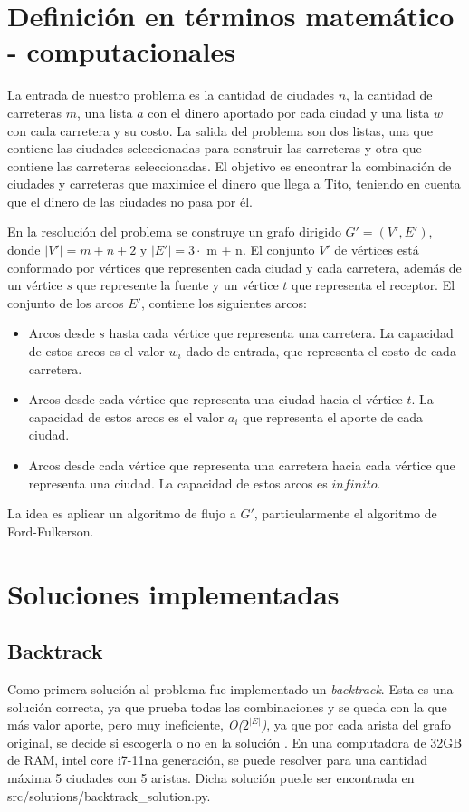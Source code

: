 \documentclass[10pt]{article} %
\begin{document}
	\section{Definici\'on en t\'erminos matem\'atico - computacionales}\label{section_2}
	
	La entrada de nuestro problema es la cantidad de ciudades $n$, la cantidad de carreteras $m$, una lista $a$ con el dinero aportado por cada ciudad y una lista $w$ con cada carretera  y su costo. La salida del problema son dos listas, una que contiene las ciudades seleccionadas para construir las carreteras y otra que contiene las carreteras seleccionadas. El objetivo es encontrar la combinaci\'on de ciudades y carreteras que maximice el dinero que llega a Tito, teniendo en cuenta que el dinero de las ciudades no pasa por \'el.
	
	En la resoluci\'on del problema se construye un grafo dirigido $G'=(V',E')$, donde $|V'| = m + n + 2$ y $|E'|= 3 \cdot$ m + n. El conjunto $V'$ de v\'ertices est\'a conformado por v\'ertices que representen cada ciudad y cada carretera, adem\'as de un v\'ertice $s$ que represente la fuente y un v\'ertice $t$ que representa el receptor. El conjunto de los arcos $E'$, contiene los siguientes arcos:
	\begin{itemize}
		\item Arcos desde $s$ hasta cada v\'ertice que representa una carretera. La capacidad de estos arcos es el valor $w_i$ dado de entrada, que representa el costo de cada carretera.
		
		\item Arcos desde cada v\'ertice que representa una ciudad hacia el v\'ertice $t$. La capacidad de estos arcos es el valor $a_i$ que representa el aporte de cada ciudad.
		
		\item Arcos desde cada v\'ertice que representa una carretera hacia cada v\'ertice que representa una ciudad. La capacidad de estos arcos es $infinito$.
		
	\end{itemize}

	La idea es aplicar un algoritmo de flujo a $G'$, particularmente el algoritmo de Ford-Fulkerson. 
	
	\section{Soluciones implementadas}
	
	\subsection{Backtrack}
		Como primera solución al problema fue implementado un \textit{backtrack}. Esta es una solución correcta, ya que prueba todas las combinaciones y se queda con la que más valor aporte, pero muy ineficiente, \textit{O($2^{|E|}$)}, ya que por cada arista del grafo original, se decide si escogerla o no en la soluci\'on . En una computadora de 32GB de RAM, intel core i7-11na generación, se puede resolver para una cantidad máxima 5 ciudades con 5 aristas. Dicha solución puede ser encontrada en src/solutions/backtrack\_solution.py.
	
\end{document}
